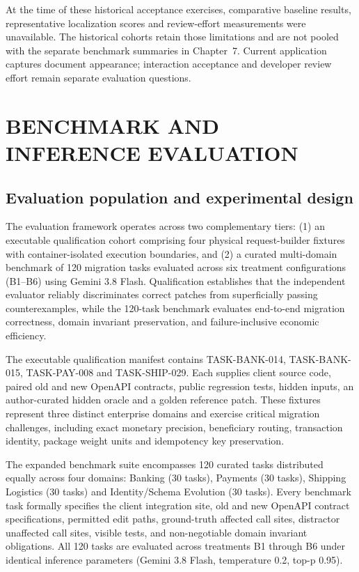 \documentclass[12pt,a4paper,oneside]{report}
\begin{document}
At the time of these historical acceptance exercises, comparative baseline results, representative localization scores and review-effort measurements were unavailable. The historical cohorts retain those limitations and are not pooled with the separate benchmark summaries in Chapter~7. Current application captures document appearance; interaction acceptance and developer review effort remain separate evaluation questions.

\chapter{BENCHMARK AND INFERENCE EVALUATION}
\section{Evaluation population and experimental design}

The evaluation framework operates across two complementary tiers: (1) an executable qualification cohort comprising four physical request-builder fixtures with container-isolated execution boundaries, and (2) a curated multi-domain benchmark of 120 migration tasks evaluated across six treatment configurations (B1--B6) using Gemini 3.8 Flash. Qualification establishes that the independent evaluator reliably discriminates correct patches from superficially passing counterexamples, while the 120-task benchmark evaluates end-to-end migration correctness, domain invariant preservation, and failure-inclusive economic efficiency.

The executable qualification manifest contains TASK-BANK-014, TASK-BANK-015, TASK-PAY-008 and TASK-SHIP-029. Each supplies client source code, paired old and new OpenAPI contracts, public regression tests, hidden inputs, an author-curated hidden oracle and a golden reference patch. These fixtures represent three distinct enterprise domains and exercise critical migration challenges, including exact monetary precision, beneficiary routing, transaction identity, package weight units and idempotency key preservation.

The expanded benchmark suite encompasses 120 curated tasks distributed equally across four domains: Banking (30 tasks), Payments (30 tasks), Shipping Logistics (30 tasks) and Identity/Schema Evolution (30 tasks). Every benchmark task formally specifies the client integration site, old and new OpenAPI contract specifications, permitted edit paths, ground-truth affected call sites, distractor unaffected call sites, visible tests, and non-negotiable domain invariant obligations. All 120 tasks are evaluated across treatments B1 through B6 under identical inference parameters (Gemini 3.8 Flash, temperature 0.2, top-p 0.95).
\end{document}

